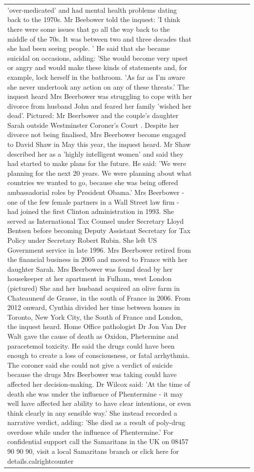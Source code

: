 \begin{table}[H]
\begin{tabular}{lllrlllll}
'over-medicated' and had mental health problems dating back to the 1970s. Mr Beebower told the inquest: 'I think there were some issues that go all the way back to the middle of the 70s. It was between two and three decades that she had been seeing people. ' He said that she became suicidal on occasions, adding: 'She would become very upset or angry and would make these kinds of statements and, for example, lock herself in the bathroom. 'As far as I'm aware she never undertook any action on any of these threats.' The inquest heard Mrs Beerbower was struggling to cope with her divorce from husband John and feared her family 'wished her dead'. Pictured: Mr Beerbower and the couple's daughter Sarah outside Westminster Coroner's Court . Despite her divorce not being finalised, Mrs Beerbower become engaged to David Shaw in May this year, the inquest heard. Mr Shaw described her as a 'highly intelligent women' and said they had started to make plans for the future. He said: 'We were planning for the next 20 years. We were planning about what countries we wanted to go, because she was being offered ambassadorial roles by President Obama.' Mrs Beerbower - one of the few female partners in a Wall Street law firm - had joined the first Clinton administration in 1993. She served as International Tax Counsel under Secretary Lloyd Bentsen before becoming Deputy Assistant Secretary for Tax Policy under Secretary Robert Rubin. She left US Government service in late 1996. Mrs Beerbower retired from the financial business in 2005 and moved to France with her daughter Sarah. Mrs Beerbower was found dead by her housekeeper at her apartment in Fulham, west London (pictured) She and her husband acquired an olive farm in Chateauneuf de Grasse, in the south of France in 2006. From 2012 onward, Cynthia divided her time between homes in Toronto, New York City, the South of France and London, the inquest heard. Home Office pathologist Dr Jon Van Der Walt gave the cause of death as Oxidon, Phetermine and paracetemol toxicity. He said the drugs could have been enough to create a loss of consciousness, or fatal arrhythmia. The coroner said she could not give a verdict of suicide because the drugs Mrs Beerbower was taking could have affected her decision-making. Dr Wilcox said: 'At the time of death she was under the influence of Phentermine - it may well have affected her ability to have clear intentions, or even think clearly in any sensible way.' She instead recorded a narrative verdict, adding: 'She died as a result of poly-drug overdose while under the influence of Phentermine.' For confidential support call the Samaritans in the UK on 08457 90 90 90, visit a local Samaritans branch or click here for details.calrightcounter \\

\end{tabular}
\end{table}
